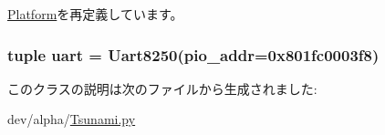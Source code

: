 \hyperlink{classPlatform_1_1Platform_acce15679d830831b0bbe8ebc2a60b2ca}{Platform}を再定義しています。\hypertarget{classTsunami_1_1Tsunami_a1f69fbabd17d6bca63f97f9754247cfd}{
\subsubsection[{uart}]{\setlength{\rightskip}{0pt plus 5cm}tuple {\bf uart} = {\bf Uart8250}(pio\_\-addr=0x801fc0003f8)}}
\label{classTsunami_1_1Tsunami_a1f69fbabd17d6bca63f97f9754247cfd}


このクラスの説明は次のファイルから生成されました:\begin{DoxyCompactItemize}
\item 
dev/alpha/\hyperlink{Tsunami_8py}{Tsunami.py}\end{DoxyCompactItemize}
